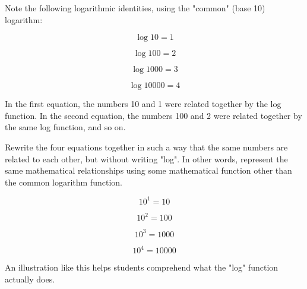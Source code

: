 

Note the following logarithmic identities, using the "common" (base 10) logarithm:

$$\log 10 = 1$$

$$\log 100 = 2$$

$$\log 1000 = 3$$

$$\log 10000 = 4$$

In the first equation, the numbers 10 and 1 were related together by the log function.  In the second equation, the numbers 100 and 2 were related together by the same log function, and so on.

Rewrite the four equations together in such a way that the same numbers are related to each other, but without writing "log".  In other words, represent the same mathematical relationships using some mathematical function other than the common logarithm function.







$$10^1 = 10$$

$$10^2 = 100$$

$$10^3 = 1000$$

$$10^4 = 10000$$







An illustration like this helps students comprehend what the "log" function actually does.




